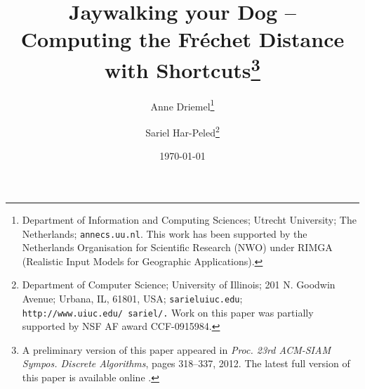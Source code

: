\documentclass[12pt]{article}
\newcommand{\atgen}{\symbol{'100}}
\newcommand{\SarielThanks}[1]{\thanks{Department of Computer
      Science; 
      University of Illinois; 
      201 N. Goodwin Avenue;
      Urbana, IL, 61801, USA;
      {\tt sariel\atgen{}uiuc.edu}; {\tt
         {{http://www.uiuc.edu/\string~sariel/}}.} #1}}
\providecommand{\si}[1]{#1}
\newcommand{\Frechet}{Fr\'{e}c{h}e{}t\xspace}\providecommand{\Arr}{\mathop{\mathrm{\EuScript{A}}}}
\numberwithin{figure}{section}
\numberwithin{equation}{section}
\begin{document}
\title{Jaywalking your Dog --\\
   Computing the \Frechet Distance with Shortcuts\thanks{A preliminary version of this paper appeared in {\em \si{Proc.}
         23rd ACM-SIAM \si{Sympos.} Discrete Algorithms}, pages
      318--337, 2012.  The latest full version of this paper is
      available online \cite{dh-jydfd-11}. }}

\author{Anne Driemel\thanks{Department of Information and Computing Sciences; Utrecht
      University; The Netherlands;
      \texttt{an{}n{}e}\hspace{0cm}\texttt{\atgen{}\si{cs.uu.nl}}.
      This work has been supported by the Netherlands
      \si{Organisation} for Scientific Research (\si{NWO}) under
      \si{RIMGA} (Realistic Input Models for Geographic
      Applications).} \and Sariel Har-Peled\SarielThanks{Work on this paper was partially supported by NSF AF
      award CCF-0915984.}  }


\date{\today}

\maketitle

\end{document}
